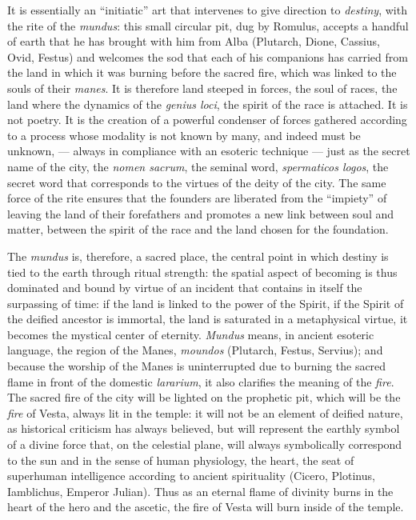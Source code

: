 It is essentially an ``initiatic'' art that intervenes to give direction to \emph{destiny}, with the rite of the \emph{mundus}: this small circular pit, dug by Romulus, accepts a handful of earth that he has brought with him from Alba (Plutarch, Dione, Cassius, Ovid, Festus) and welcomes the sod that each of his companions has carried from the land in which it was burning before the sacred fire, which was linked to the souls of their \emph{manes}. It is therefore land steeped in forces, the soul of races, the land where the dynamics of the \emph{genius loci}, the spirit of the race is attached. It is not poetry. It is the creation of a powerful condenser of forces gathered according to a process whose modality is not known by many, and indeed must be unknown, --- always in compliance with an esoteric technique --- just as the secret name of the city, the \emph{nomen sacrum}, the seminal word, \emph{spermaticos logos}, the secret word that corresponds to the virtues of the deity of the city. The same force of the rite ensures that the founders are liberated from the ``impiety'' of leaving the land of their forefathers and promotes a new link between soul and matter, between the spirit of the race and the land chosen for the foundation.

The \emph{mundus} is, therefore, a sacred place, the central point in which destiny is tied to the earth through ritual strength: the spatial aspect of becoming is thus dominated and bound by virtue of an incident that contains in itself the surpassing of time: if the land is linked to the power of the Spirit, if the Spirit of the deified ancestor is immortal, the land is saturated in a metaphysical virtue, it becomes the mystical center of eternity. \emph{Mundus} means, in ancient esoteric language, the region of the Manes, \emph{moundos} (Plutarch, Festus, Servius); and because the worship of the Manes is uninterrupted due to burning the sacred flame in front of the domestic \emph{lararium}, it also clarifies the meaning of the \emph{fire}. The sacred fire of the city will be lighted on the prophetic pit, which will be the \emph{fire} of Vesta, always lit in the temple: it will not be an element of deified nature, as historical criticism has always believed, but will represent the earthly symbol of a divine force that, on the celestial plane, will always symbolically correspond to the sun and in the sense of human physiology, the heart, the seat of superhuman intelligence according to ancient spirituality (Cicero, Plotinus, Iamblichus, Emperor Julian). Thus as an eternal flame of divinity burns in the heart of the hero and the ascetic, the fire of Vesta will burn inside of the temple.


